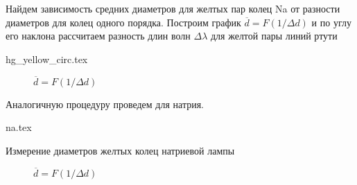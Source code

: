 Найдем зависимость средних диаметров для желтых пар колец Na от разности диаметров
для колец одного порядка. Построим график $\overline{d} = F(1/\Delta d)$ и по
углу его наклона рассчитаем разность длин волн $\Delta \lambda$ для желтой пары
линий ртути

{hg_yellow_circ.tex}

\begin{figure}
  \caption{$\overline{d} = F(1/\Delta d)$}
  \label{img::avg_diam_hg}
\end{figure}

\hfill \break

Аналогичную процедуру проведем для натрия.
\begin{table}
  \begin{center}
    {na.tex}
  \end{center}
  \caption{Измерение диаметров желтых колец натриевой лампы}
\end{table}

\begin{figure}
  \caption{$\overline{d} = F(1/\Delta d)$}
  \label{img::avg_diam_na}
\end{figure}


